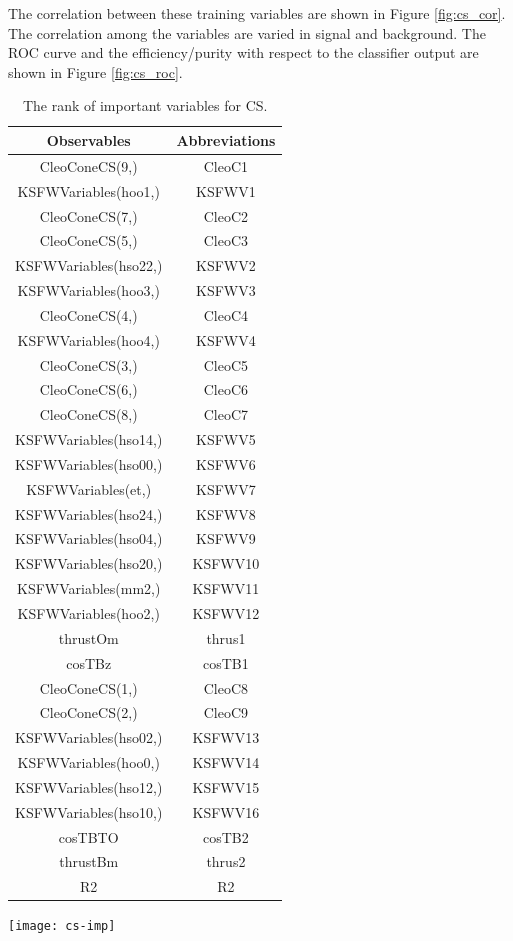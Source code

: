 The correlation between these training variables are shown in Figure \ref{fig:cs_cor}. The correlation among the variables are varied in signal and background. The ROC curve and the efficiency/purity with respect to the classifier output are shown in Figure \ref{fig:cs_roc}.
\begin{table}[htpb]
	\begin{minipage}[t]{0.4\linewidth}
		\centering
		\caption{Variables and the abbreviations for CS.}
		\label{tab:cs_abr}
		\begin{tabular}{c|c}
			\hline
			Observables &  Abbreviations\\
			\hline
			CleoConeCS(9,) &  CleoC1 \\
			KSFWVariables(hoo1,) & KSFWV1 \\
			CleoConeCS(7,) & CleoC2\\
			CleoConeCS(5,) & CleoC3\\
			KSFWVariables(hso22,) & KSFWV2\\
			KSFWVariables(hoo3,) & KSFWV3\\
			CleoConeCS(4,) & CleoC4 \\
			KSFWVariables(hoo4,) &  KSFWV4\\
			CleoConeCS(3,) & CleoC5 \\
			CleoConeCS(6,) & CleoC6\\
			CleoConeCS(8,) & CleoC7\\
			KSFWVariables(hso14,) &   KSFWV5\\
			KSFWVariables(hso00,) & KSFWV6\\
			KSFWVariables(et,) & KSFWV7\\
			KSFWVariables(hso24,) & KSFWV8\\
			KSFWVariables(hso04,) & KSFWV9\\
			KSFWVariables(hso20,) & KSFWV10 \\
			KSFWVariables(mm2,)  & KSFWV11\\
			KSFWVariables(hoo2,) &  KSFWV12\\
			thrustOm & thrus1 \\
			cosTBz & cosTB1\\
			CleoConeCS(1,) & CleoC8 \\
			CleoConeCS(2,) & CleoC9 \\
			KSFWVariables(hso02,) &  KSFWV13\\
			KSFWVariables(hoo0,) &  KSFWV14 \\
			KSFWVariables(hso12,) &  KSFWV15\\
			KSFWVariables(hso10,) & KSFWV16\\
			cosTBTO & cosTB2\\
			thrustBm & thrus2\\
			R2 & R2\\
			\hline
		\end{tabular}
	\end{minipage}
	\begin{minipage}[t]{0.5\linewidth}
		\centering 
		\caption{The rank of important variables for CS. }
		\label{tab:cs_imp}
		\texttt{[image: cs-imp]}
	\end{minipage}
\end{table}

